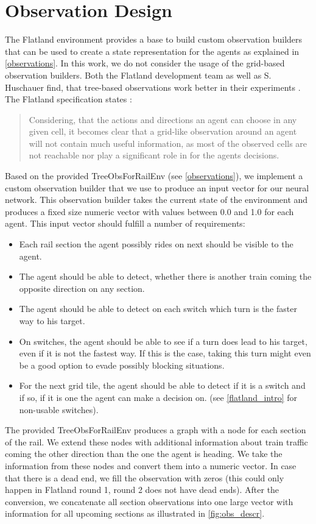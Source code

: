 \section{Observation Design}\label{enhanced_observations}
The Flatland environment provides a base to build custom observation builders that can be used to create a state representation for the agents as explained in \autoref{observations}. In this work, we do not consider the usage of the grid-based observation builders.
Both the Flatland development team as well as S. Huschauer find, that tree-based observations work better in their experiments \cite{flatlandstephan}. The Flatland specification states \cite{flatland_spec}:
\begin{quote}
	Considering, that the actions and directions an agent can choose in any given cell, it becomes clear that a grid-like observation around an agent will not contain much useful information, as most of the observed cells are not reachable nor play a significant role in for the agents decisions.
\end{quote}
Based on the provided TreeObsForRailEnv (see \autoref{observations}), we implement a custom observation builder that we use to produce an input vector for our neural network. This observation builder takes the current state of the environment and produces a fixed size numeric vector with values between 0.0 and 1.0 for each agent. This input vector should fulfill a number of requirements:
\begin{itemize}
	\item Each rail section the agent possibly rides on next should be visible to the agent.
	\item The agent should be able to detect, whether there is another train coming the opposite direction on any section.
	\item The agent should be able to detect on each switch which turn is the faster way to his target.
	\item On switches, the agent should be able to see if a turn does lead to his target, even if it is not the fastest way. If this is the case, taking this turn might even be a good option to evade possibly blocking situations.
	\item For the next grid tile, the agent should be able to detect if it is a switch and if so, if it is one the agent can make a decision on. (see \autoref{flatland_intro} for non-usable switches).
\end{itemize}
The provided TreeObsForRailEnv produces a graph with a node for each section of the rail. We extend these nodes with additional information about train traffic coming the other direction than the one the agent is heading. We take the information from these nodes and convert them into a numeric vector. In case that there is a dead end, we fill the observation with zeros (this could only happen in Flatland round 1, round 2 does not have dead ends). After the conversion, we concatenate all section observations into one large vector with information for all upcoming sections as illustrated in \autoref{fig:obs_descr}.\\
